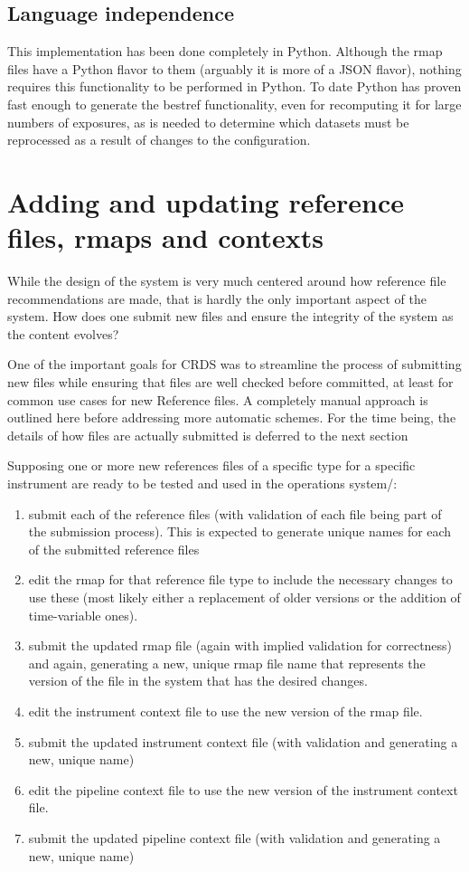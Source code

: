 \documentclass[final,authoryear,5p,times,twocolumn]{elsarticle}
\begin{document}
\subsection{Language independence}

This implementation has been done completely in Python. Although the rmap files
have a Python flavor to them (arguably it is more of a JSON flavor), nothing
requires this functionality to be performed in Python. To date Python has
proven fast enough to generate the bestref functionality, even for recomputing it
for large numbers of exposures, as is needed to determine which datasets must
be reprocessed as a result of changes to the configuration.

\section{Adding and updating reference files, rmaps and contexts}

While the design of the system is very much centered around how reference file
recommendations are made, that is hardly the only important aspect of the
system. How does one submit new files and ensure the integrity of the system as
the content evolves?

One of the important goals for CRDS was to streamline the process of submitting
new files while ensuring that files are well checked before committed, at least
for common use cases for new Reference files. A completely manual approach is
outlined here before addressing more automatic schemes. For the time being, the
details of how files are actually submitted is deferred to the next section

Supposing one or more new references files of a specific type for a specific
instrument are ready to be tested and used in the operations system/:

\begin{enumerate}
\item submit each of the reference files (with validation of each file
being part of the submission process). This is expected to generate
unique names for each of the submitted reference files
\item edit the rmap for that reference file type to include the necessary
changes to use these (most likely either a replacement of older versions
or the addition of time-variable ones).
\item submit the updated rmap file (again with implied validation for
correctness)
and again, generating a new, unique rmap file name that represents the version
of the file in the system that has the desired changes.
\item edit the instrument context file to use the new version of the rmap file.
\item submit the updated instrument context file (with validation and 
generating a new, unique name)
\item edit the pipeline context file to use the new version of the
instrument context file.
\item submit the updated pipeline context file (with validation and 
generating a new, unique name)
\end{enumerate}
\end{document}
